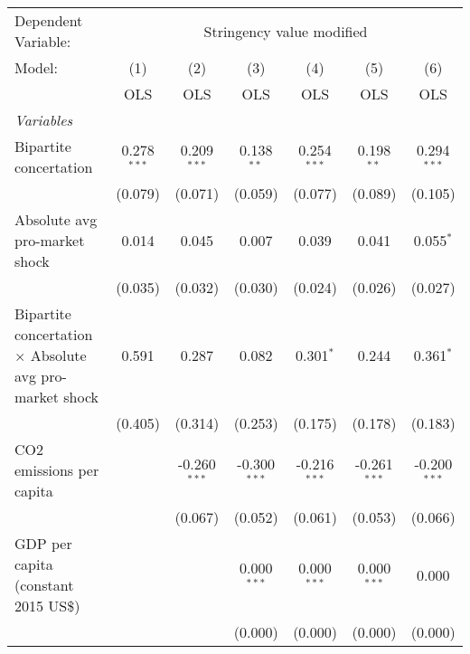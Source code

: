 
\begingroup
\centering
\begin{tabular}{lcccccc}
   \toprule
   Dependent Variable: & \multicolumn{6}{c}{Stringency value modified}\\
   Model:                                                         & (1)           & (2)            & (3)            & (4)            & (5)            & (6)\\  
                                                                  &  OLS          & OLS            & OLS            & OLS            & OLS            & OLS\\  
   \midrule
   \emph{Variables}\\
   Bipartite concertation                                         & 0.278$^{***}$ & 0.209$^{***}$  & 0.138$^{**}$   & 0.254$^{***}$  & 0.198$^{**}$   & 0.294$^{***}$\\   
                                                                  & (0.079)       & (0.071)        & (0.059)        & (0.077)        & (0.089)        & (0.105)\\   
   Absolute avg pro-market shock                                  & 0.014         & 0.045          & 0.007          & 0.039          & 0.041          & 0.055$^{*}$\\   
                                                                  & (0.035)       & (0.032)        & (0.030)        & (0.024)        & (0.026)        & (0.027)\\   
   Bipartite concertation $\times$ Absolute avg pro-market shock  & 0.591         & 0.287          & 0.082          & 0.301$^{*}$    & 0.244          & 0.361$^{*}$\\   
                                                                  & (0.405)       & (0.314)        & (0.253)        & (0.175)        & (0.178)        & (0.183)\\   
   CO2 emissions per capita                                       &               & -0.260$^{***}$ & -0.300$^{***}$ & -0.216$^{***}$ & -0.261$^{***}$ & -0.200$^{***}$\\   
                                                                  &               & (0.067)        & (0.052)        & (0.061)        & (0.053)        & (0.066)\\   
   GDP per capita (constant 2015 US\$)                            &               &                & 0.000$^{***}$  & 0.000$^{***}$  & 0.000$^{***}$  & 0.000\\   
                                                                  &               &                & (0.000)        & (0.000)        & (0.000)        & (0.000)\\   

\end{tabular}
